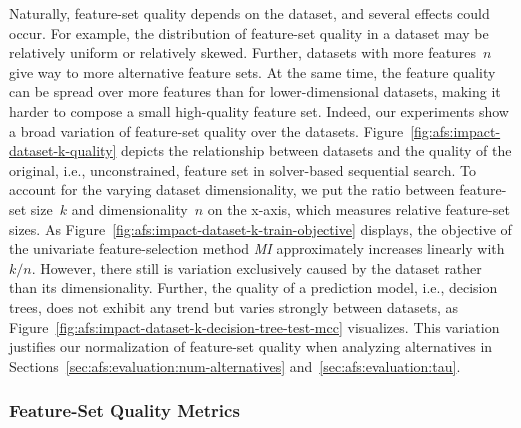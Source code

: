 \documentclass{article}
\theoremstyle{definition}
\begin{document}
Naturally, feature-set quality depends on the dataset, and several effects could occur.
For example, the distribution of feature-set quality in a dataset may be relatively uniform or relatively skewed.
Further, datasets with more features~$n$ give way to more alternative feature sets.
At the same time, the feature quality can be spread over more features than for lower-dimensional datasets, making it harder to compose a small high-quality feature set.
Indeed, our experiments show a broad variation of feature-set quality over the datasets.
Figure~\ref{fig:afs:impact-dataset-k-quality} depicts the relationship between datasets and the quality of the original, i.e., unconstrained, feature set in solver-based sequential search.
To account for the varying dataset dimensionality, we put the ratio between feature-set size~$k$ and dimensionality~$n$ on the x-axis, which measures relative feature-set sizes.
As Figure~\ref{fig:afs:impact-dataset-k-train-objective} displays, the objective of the univariate feature-selection method \emph{MI} approximately increases linearly with~$k/n$.
However, there still is variation exclusively caused by the dataset rather than its dimensionality.
Further, the quality of a prediction model, i.e., decision trees, does not exhibit any trend but varies strongly between datasets, as Figure~\ref{fig:afs:impact-dataset-k-decision-tree-test-mcc} visualizes.
This variation justifies our normalization of feature-set quality when analyzing alternatives in Sections~\ref{sec:afs:evaluation:num-alternatives} and~\ref{sec:afs:evaluation:tau}.

\subsubsection{Feature-Set Quality Metrics}
\label{sec:afs:appendix:evaluation:metrics}
\end{document}
